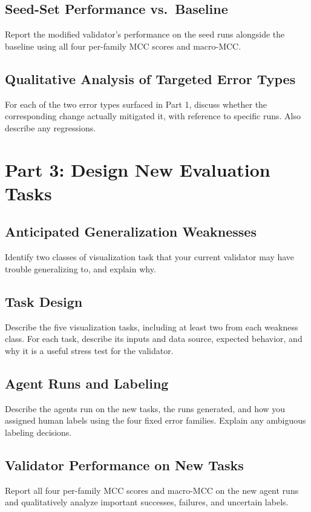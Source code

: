 \documentclass[11pt]{article}
\begin{document}
\subsection{Seed-Set Performance vs.\ Baseline}
Report the modified validator's performance on the seed runs alongside the
baseline using all four per-family MCC scores and macro-MCC.

\subsection{Qualitative Analysis of Targeted Error Types}
For each of the two error types surfaced in Part 1, discuss whether the
corresponding change actually mitigated it, with reference to specific runs.
Also describe any regressions.

\section{Part 3: Design New Evaluation Tasks}

\subsection{Anticipated Generalization Weaknesses}
Identify two classes of visualization task that your current validator may
have trouble generalizing to, and explain why.

\subsection{Task Design}
Describe the five visualization tasks, including at least two from each
weakness class. For each task, describe its inputs and data source, expected
behavior, and why it is a useful stress test for the validator.

\subsection{Agent Runs and Labeling}
Describe the agents run on the new tasks, the runs generated, and how you
assigned human labels using the four fixed error families. Explain any
ambiguous labeling decisions.

\subsection{Validator Performance on New Tasks}
Report all four per-family MCC scores and macro-MCC on the new agent runs and qualitatively
analyze important successes, failures, and uncertain labels.
\end{document}
